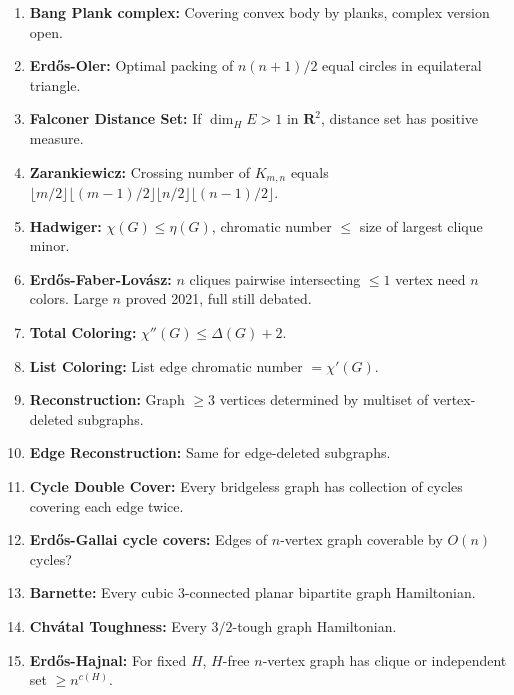 \documentclass[aps,prd,amsmath,amssymb,twocolumn,superscriptaddress]{revtex4-2}
\begin{document}
\begin{enumerate}[label={\bf \arabic*.}, leftmargin=*, itemsep=2pt]
\item \textbf{Bang Plank complex:} Covering convex body by planks, complex version open.

\item \textbf{Erd\H{o}s-Oler:} Optimal packing of $n(n+1)/2$ equal circles in equilateral triangle.

\item \textbf{Falconer Distance Set:} If $\dim_H E>1$ in $\mathbf R^2$, distance set has positive measure.

\item \textbf{Zarankiewicz:} Crossing number of $K_{m,n}$ equals $\lfloor m/2\rfloor\lfloor(m-1)/2\rfloor\lfloor n/2\rfloor\lfloor(n-1)/2\rfloor$.

\item \textbf{Hadwiger:} $\chi(G)\le\eta(G)$, chromatic number $\le$ size of largest clique minor.

\item \textbf{Erd\H{o}s-Faber-Lov\'asz:} $n$ cliques pairwise intersecting $\le1$ vertex need $n$ colors. Large $n$ proved 2021, full still debated.

\item \textbf{Total Coloring:} $\chi''(G)\le\Delta(G)+2$.

\item \textbf{List Coloring:} List edge chromatic number $=\chi'(G)$.

\item \textbf{Reconstruction:} Graph $\ge3$ vertices determined by multiset of vertex-deleted subgraphs.

\item \textbf{Edge Reconstruction:} Same for edge-deleted subgraphs.

\item \textbf{Cycle Double Cover:} Every bridgeless graph has collection of cycles covering each edge twice.

\item \textbf{Erd\H{o}s-Gallai cycle covers:} Edges of $n$-vertex graph coverable by $O(n)$ cycles?

\item \textbf{Barnette:} Every cubic $3$-connected planar bipartite graph Hamiltonian.

\item \textbf{Chv\'atal Toughness:} Every $3/2$-tough graph Hamiltonian.

\item \textbf{Erd\H{o}s-Hajnal:} For fixed $H$, $H$-free $n$-vertex graph has clique or independent set $\ge n^{c(H)}$.


\end{enumerate}
\end{document}
